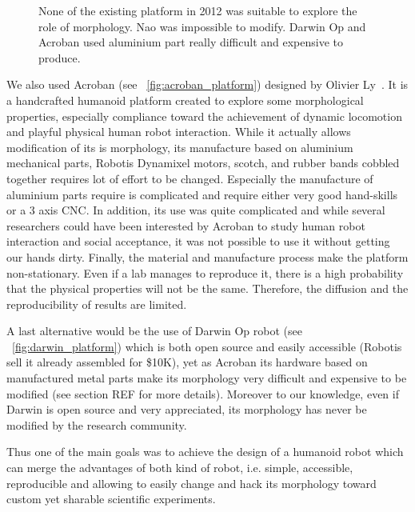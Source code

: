 \begin{figure}[]
\centering
    \hfil
    \hfil
    \caption{None of the existing platform in 2012 was suitable to explore the role of morphology. Nao was impossible to modify. Darwin Op and Acroban used aluminium part really difficult and expensive to produce.}
    \label{fig:2012_Humanoids}
\end{figure}

We also used Acroban (see \figurename~\ref{fig:acroban_platform}) designed by Olivier Ly~\cite{Ly2010}. It is a handcrafted humanoid platform created to explore some morphological properties, especially compliance toward the achievement of dynamic locomotion and playful physical human robot interaction.
While it actually allows modification of its is morphology, its manufacture based on aluminium mechanical parts, Robotis Dynamixel motors, scotch, and rubber bands cobbled together requires lot of effort to be changed. Especially the manufacture of aluminium parts require is complicated and require either very good hand-skills or a 3 axis CNC.
In addition, its use was quite complicated and while several researchers could have been interested by Acroban to study human robot interaction and social acceptance, it was not possible to use it without getting our hands dirty.
Finally, the material and manufacture process make the platform non-stationary. Even if a lab manages to reproduce it, there is a high probability that the physical properties will not be the same. Therefore, the diffusion and the reproducibility of results are limited.


A last alternative would be the use of Darwin Op robot (see \figurename~\ref{fig:darwin_platform}) which is both open source and easily accessible (Robotis sell it already assembled for \$10K), yet as Acroban its hardware based on manufactured metal parts make its morphology very difficult and expensive to be modified (see section REF for more details). Moreover to our knowledge, even if Darwin is open source and very appreciated, its morphology has never be modified by the research community.

Thus one of the main goals was to achieve the design of a humanoid robot which can merge the advantages of both kind of robot, i.e. simple, accessible, reproducible and allowing to easily change and hack its morphology toward custom yet sharable scientific experiments.

